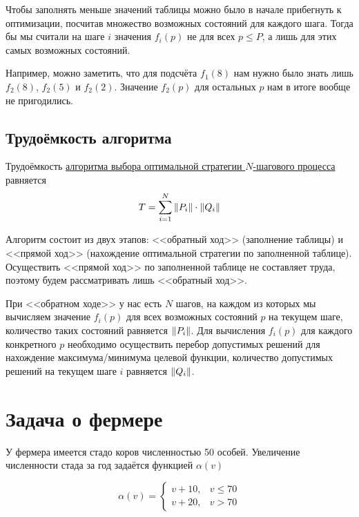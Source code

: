 \remark

Чтобы заполнять меньше значений таблицы можно было в начале прибегнуть к оптимизации, посчитав множество возможных состояний для каждого шага. Тогда бы мы считали на шаге $i$ значения $f_i(p)$ не для всех $p \le P$, а лишь для этих самых возможных состояний.

Например, можно заметить, что для подсчёта $f_1(8)$ нам нужно было знать лишь $f_2(8)$, $f_2(5)$ и $f_2(2)$. Значение $f_2(p)$ для остальных $p$ нам в итоге вообще не пригодились.

\subsection{Трудоёмкость алгоритма}\label{n_step_complexity}

\fact

Трудоёмкость \hyperref[def:opt_strategy]{алгоритма выбора оптимальной стратегии $N$-шагового процесса} равняется
\[
T = \sum_{i=1}^{N} \norm{P_i} \cdot \norm{Q_i}
\]

\prooof

Алгоритм состоит из двух этапов: <<обратный ход>> (заполнение таблицы) и <<прямой ход>> (нахождение оптимальной стратегии по заполненной таблице). Осуществить <<прямой ход>> по заполненной таблице не составляет труда, поэтому будем рассматривать лишь <<обратный ход>>.

При <<обратном ходе>> у нас есть $N$ шагов, на каждом из которых мы вычисляем значение $f_i(p)$ для всех возможных состояний $p$ на текущем шаге, количество таких состояний равняется $\norm{P_i}$. Для вычисления $f_i(p)$ для каждого конкретного $p$ необходимо осуществить перебор допустимых решений для нахождение максимума/минимума целевой функции, количество допустимых решений на текущем шаге $i$ равняется $\norm{Q_i}$.


\section{Задача о фермере}

\problem[о фермере]

У фермера имеется стадо коров численностью 50 особей. Увеличение численности стада за год задаётся функцией $\alpha(v)$

\[
\alpha(v) = \begin{cases}
	v + 10,& v \le 70 \\
	v + 20,& v > 70
\end{cases}
\]

